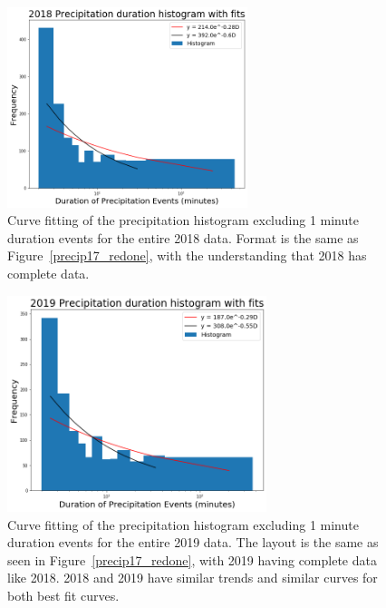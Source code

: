 \documentclass[11pt]{report}
\begin{document}
\begin{figure}[b]
\centering
\includegraphics[width=0.625\textwidth]{Figures/precip18_new.png}
\caption[2018 precipitation duration exponentials with contrasting curve fitting]
{\label{precip18_redone}Curve fitting of the precipitation histogram
  excluding 1 minute duration events for the entire 2018 data. Format is the
  same as Figure~\ref{precip17_redone}, with the understanding that 2018 has
  complete data.}
\end{figure}

\clearpage

\begin{figure}[t]
\centering
\includegraphics[width=0.675\textwidth]{Figures/precip19_new.png}
\caption[2019 precipitation duration exponentials with contrasting curve fitting]
{\label{precip19_redone}Curve fitting of the precipitation histogram
  excluding 1 minute duration events for the entire 2019 data. The layout is
  the same as seen in Figure~\ref{precip17_redone}, with 2019 having complete data
  like 2018. 2018 and 2019 have similar trends and similar curves for both
  best fit curves.}
\end{figure}
\end{document}
